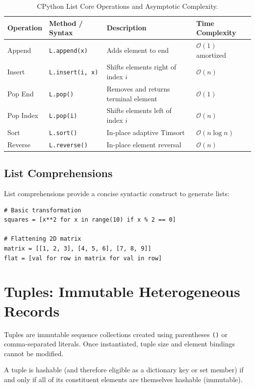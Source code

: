 \begin{table}[htbp]
\centering
\begin{tabularx}{\textwidth}{l l X l}
\toprule
\textbf{Operation} & \textbf{Method / Syntax} & \textbf{Description} & \textbf{Time Complexity} \\
\midrule
Append & \texttt{L.append(x)} & Adds element to end & $\mathcal{O}(1)$ amortized \\
Insert & \texttt{L.insert(i, x)} & Shifts elements right of index $i$ & $\mathcal{O}(n)$ \\
Pop End & \texttt{L.pop()} & Removes and returns terminal element & $\mathcal{O}(1)$ \\
Pop Index & \texttt{L.pop(i)} & Shifts elements left of index $i$ & $\mathcal{O}(n)$ \\
Sort & \texttt{L.sort()} & In-place adaptive Timsort & $\mathcal{O}(n \log n)$ \\
Reverse & \texttt{L.reverse()} & In-place element reversal & $\mathcal{O}(n)$ \\
\bottomrule
\end{tabularx}
\caption{CPython List Core Operations and Asymptotic Complexity.}
\label{tab:list_complexity}
\end{table}

\subsection{List Comprehensions}
List comprehensions provide a concise syntactic construct to generate lists:
\begin{lstlisting}[caption={Comprehension Patterns}]
# Basic transformation
squares = [x**2 for x in range(10) if x % 2 == 0]

# Flattening 2D matrix
matrix = [[1, 2, 3], [4, 5, 6], [7, 8, 9]]
flat = [val for row in matrix for val in row]
\end{lstlisting}

\section{Tuples: Immutable Heterogeneous Records}

Tuples are immutable sequence collections created using parentheses \texttt{()} or comma-separated literals. Once instantiated, tuple size and element bindings cannot be modified.

\begin{theorem}
A tuple is hashable (and therefore eligible as a dictionary key or set member) if and only if all of its constituent elements are themselves hashable (immutable).
\end{theorem}

